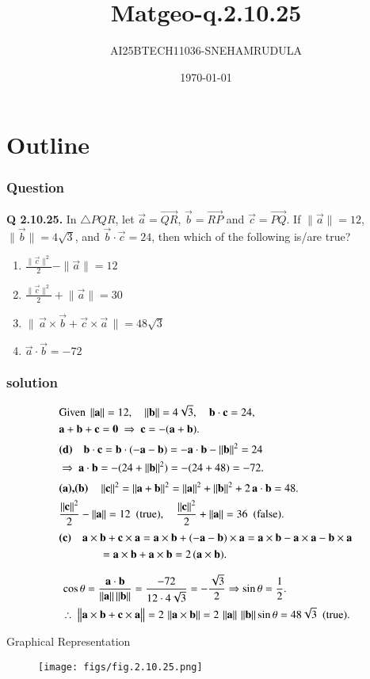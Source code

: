 \documentclass{beamer}
\title{Matgeo-q.2.10.25}
\author{AI25BTECH11036-SNEHAMRUDULA}
\date{\today}
\begin{document}
\begin{frame}
\titlepage
\end{frame}

\section*{Outline}
\begin{frame}
\frametitle{Question}
\textbf{Q 2.10.25.} In $\triangle PQR$, let $\vec a=\overrightarrow{QR}$, $\vec b=\overrightarrow{RP}$ and $\vec c=\overrightarrow{PQ}$. 
If $\lVert\vec a\rVert=12$, $\lVert\vec b\rVert=4\sqrt{3}$, and $\vec b\cdot\vec c=24$, then which of the following is/are true?
\begin{enumerate}
\item $\frac{\|\vec c\rVert^{2}}{2}-\|\vec a\|=12$
\item $\frac{\lVert\vec c\rVert^{2}}{2}+\lVert\vec a\rVert=30$
\item $\bigl\lVert\,\vec a\times\vec b+\vec c\times\vec a\,\bigr\rVert=48\sqrt{3}$
\item $\vec a\cdot\vec b=-72$
\end{enumerate}
\end{frame}
\begin{frame}
\frametitle{solution}
\begin{align}
&\text{Given } \left\lVert\mathbf a\right\rVert=12,\quad \left\lVert\mathbf b\right\rVert=4\sqrt{3},\quad \mathbf b\cdot\mathbf c=24,\\
&\mathbf a+\mathbf b+\mathbf c=\mathbf 0 \ \Rightarrow\ \mathbf c=-(\mathbf a+\mathbf b).\\[2pt]
&\textbf{(d)}\quad 
\mathbf b\cdot\mathbf c=\mathbf b\cdot(-\mathbf a-\mathbf b)=-\mathbf a\cdot\mathbf b-\left\lVert\mathbf b\right\rVert^{2}=24\\
&\Rightarrow\ \mathbf a\cdot\mathbf b=-(24+\left\lVert\mathbf b\right\rVert^{2})=-(24+48)=-72.\\[2pt]
&\textbf{(a),(b)}\quad 
\left\lVert\mathbf c\right\rVert^{2}=\left\lVert\mathbf a+\mathbf b\right\rVert^{2}
=\left\lVert\mathbf a\right\rVert^{2}+\left\lVert\mathbf b\right\rVert^{2}+2\,\mathbf a\cdot\mathbf b
=48.\\
&\frac{\left\lVert\mathbf c\right\rVert^{2}}{2}-\left\lVert\mathbf a\right\rVert=12\ \ (\text{true}),\quad
\frac{\left\lVert\mathbf c\right\rVert^{2}}{2}+\left\lVert\mathbf a\right\rVert=36\ \ (\text{false}).\\[2pt]
&\textbf{(c)}\quad 
\mathbf a\times\mathbf b+\mathbf c\times\mathbf a
=\mathbf a\times\mathbf b+(-\mathbf a-\mathbf b)\times\mathbf a
=\mathbf a\times\mathbf b-\mathbf a\times\mathbf a-\mathbf b\times\mathbf a\\
&\hspace{1.3cm}= \mathbf a\times\mathbf b+ \mathbf a\times\mathbf b
=2\,(\mathbf a\times\mathbf b).\\
\end{align}
\end{frame}
\begin{frame}
\begin{align}
&\cos\theta=\frac{\vec a\cdot\vec b}{\norm{\vec a}\norm{\vec b}}
=\dfrac{-72}{12\cdot 4\sqrt3}=-\frac{\sqrt3}{2}
\Rightarrow \sin\theta=\frac12.\\
&\therefore\ 
\bigl\lVert \vec a\times\vec b+\vec c\times\vec a \bigr\rVert
=2\,\norm{\vec a\times\vec b}
=2\,\norm{\vec a}\,\norm{\vec b}\sin\theta
=48\sqrt3\ \ (\text{true}).
\end{align}
\end{frame}

    \begin{frame}{Graphical Representation}
   \begin{figure}[h!]
\centering
\texttt{[image: figs/fig.2.10.25.png]}
\end{figure}
\end{frame}
\end{document}
